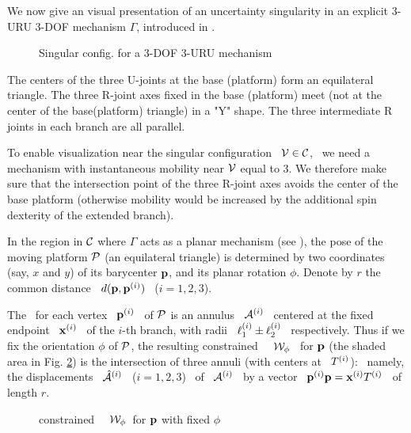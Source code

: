 %
%
 \label{cve}

We now give an visual presentation of an uncertainty singularity in an
explicit $3$-URU $3$-DOF mechanism $\Gamma$, introduced
in \cite{ZFB}.

\begin{figure}[htb]
\centering \epsfysize=5.6cm \leavevmode {}
\caption{Singular config. for a 3-DOF 3-URU mechanism}
\label{fig:triangle2} \end{figure}

The centers of the three U-joints at the base (platform) form an
equilateral triangle. The three R-joint axes fixed in the base
(platform) meet (not at the center of the base(platform) triangle) in
a "Y" shape. The three intermediate R joints in each branch are all
parallel.

\begin{remark}\label{rem:planarity}
%
To enable visualization near the singular configuration \ $\mathcal{V}\in\mathcal{C}$, \
we need a mechanism with instantaneous mobility near $\mathcal{V}$ equal to
$3$. We therefore make sure that the intersection point of the three
R-joint axes avoids the center of the base platform (otherwise
mobility would be increased by the additional spin dexterity of the
extended branch).
%
\end{remark}

In the region in $\mathcal{C}$ where $\Gamma$ acts as a planar mechanism
(see \cite{ZFB2}), the pose of the moving platform $\mathcal{P}$ (an equilateral
triangle) is determined by two coordinates (say, $x$ and $y$) of its
barycenter $\mathbf{p}$, and its planar rotation $\phi$. Denote by $r$
the common distance \ $d(\mathbf{p},\mathbf{p}\sp{({i})})$ \ ($i=1,2,3$).

The \wspace\ for each vertex \ $\mathbf{p}\sp{({i})}$ \ of $\mathcal{P}$ is an annulus \
$\mathcal{A}\sp{({i})}$ \ centered at the fixed endpoint \ $\mathbf{x}\sp{({i})}$ \ of the $i$-th
branch, with radii \ $\ell\sp{({i})}_{1}\pm\ell\sp{({i})}_{2}$ \ respectively.
Thus if we fix the orientation $\phi$ of $\mathcal{P}$, the resulting
constrained \wspace\ \ $\mathcal{W}_{\phi}$ \ for $\mathbf{p}$ (the shaded area in
Fig. \ref{annuli}) is the intersection of three annuli (with centers
at \ $T\sp{({i})}$): \ namely, the displacements \ $\hat{\mathcal{A}}\sp{({i})}$ \ ($i=1,2,3$) \
of \ $\mathcal{A}\sp{({i})}$ \ by a vector \ $\mathbf{p}\sp{({i})}\mathbf{p}=\mathbf{x}\sp{({i})}T\sp{({i})}$ \ of length $r$.

\begin{figure}[ht]
\centering
\epsfysize=7cm %
{} \caption{constrained \wspace\ \
$\mathcal{W}_{\phi}$\ for $\mathbf{p}$ with fixed $\phi$} \label{annuli}
\end{figure}


